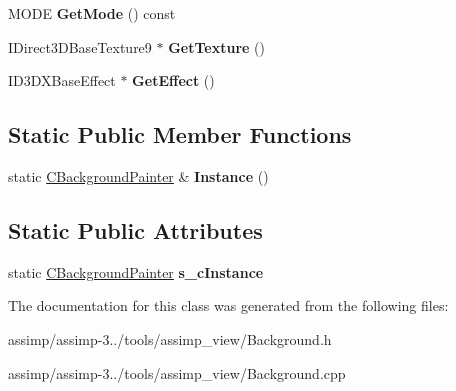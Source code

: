 \begin{DoxyCompactItemize}
\item 
\hypertarget{class_c_background_painter_ae85743e4f30c8b0f25e99f6b0461bf1f}{M\+O\+D\+E {\bfseries Get\+Mode} () const }\label{class_c_background_painter_ae85743e4f30c8b0f25e99f6b0461bf1f}

\item 
\hypertarget{class_c_background_painter_a16b2a73f5a4bd0d7390a249df7106291}{I\+Direct3\+D\+Base\+Texture9 $\ast$ {\bfseries Get\+Texture} ()}\label{class_c_background_painter_a16b2a73f5a4bd0d7390a249df7106291}

\item 
\hypertarget{class_c_background_painter_ab3c60e9a0014c426718d948663d74ccc}{I\+D3\+D\+X\+Base\+Effect $\ast$ {\bfseries Get\+Effect} ()}\label{class_c_background_painter_ab3c60e9a0014c426718d948663d74ccc}

\end{DoxyCompactItemize}
\subsection*{Static Public Member Functions}
\begin{DoxyCompactItemize}
\item 
\hypertarget{class_c_background_painter_a84ed8b20333a2b0ba7a8aedfcc05bc09}{static \hyperlink{class_c_background_painter}{C\+Background\+Painter} \& {\bfseries Instance} ()}\label{class_c_background_painter_a84ed8b20333a2b0ba7a8aedfcc05bc09}

\end{DoxyCompactItemize}
\subsection*{Static Public Attributes}
\begin{DoxyCompactItemize}
\item 
\hypertarget{class_c_background_painter_a1bf25428a73a084044b73578f778ccc9}{static \hyperlink{class_c_background_painter}{C\+Background\+Painter} {\bfseries s\+\_\+c\+Instance}}\label{class_c_background_painter_a1bf25428a73a084044b73578f778ccc9}

\end{DoxyCompactItemize}


The documentation for this class was generated from the following files\+:\begin{DoxyCompactItemize}
\item 
assimp/assimp-\/3../tools/assimp\+\_\+view/Background.\+h\item 
assimp/assimp-\/3../tools/assimp\+\_\+view/Background.\+cpp\end{DoxyCompactItemize}
